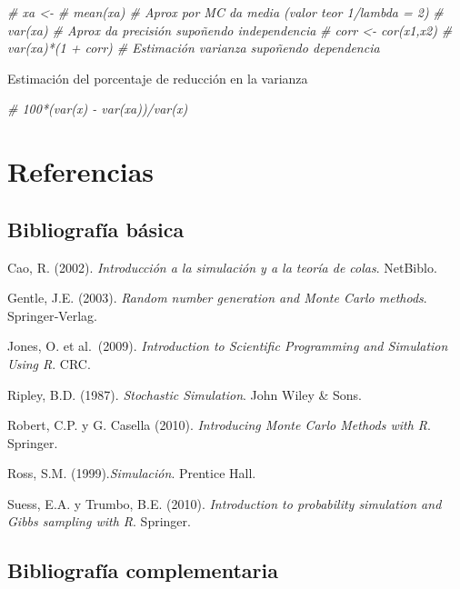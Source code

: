 \documentclass[
]{book}
\newenvironment{Shaded}{\begin{snugshade}}{\end{snugshade}}
\newcommand{\CommentTok}[1]{\textcolor[rgb]{0.56,0.35,0.01}{\textit{#1}}}
\theoremstyle{break}
\theoremstyle{definition}
\theoremstyle{definition}
\theoremstyle{definition}
\theoremstyle{remark}
\begin{document}
\begin{Shaded}
\begin{Highlighting}[]
\CommentTok{# xa <-}
\CommentTok{# mean(xa) # Aprox por MC da media (valor teor 1/lambda = 2)}
\CommentTok{# var(xa)  # Aprox da precisión supoñendo independencia}
\CommentTok{# corr <- cor(x1,x2)}
\CommentTok{# var(xa)*(1 + corr) # Estimación varianza supoñendo dependencia}
\end{Highlighting}
\end{Shaded}

Estimación del porcentaje de reducción en la varianza

\begin{Shaded}
\begin{Highlighting}[]
\CommentTok{# 100*(var(x) - var(xa))/var(x)}
\end{Highlighting}
\end{Shaded}

\hypertarget{referencias}{%
\chapter*{Referencias}\label{referencias}}

\hypertarget{bibliografuxeda-buxe1sica}{%
\section*{Bibliografía básica}\label{bibliografuxeda-buxe1sica}}

Cao, R. (2002). \emph{Introducción a la simulación y a la teoría de colas}. NetBiblo.

Gentle, J.E. (2003). \emph{Random number generation and Monte Carlo methods}. Springer‐Verlag.

Jones, O. et al.~(2009). \emph{Introduction to Scientific Programming and Simulation Using R}. CRC.

Ripley, B.D. (1987). \emph{Stochastic Simulation}. John Wiley \& Sons.

Robert, C.P. y G. Casella (2010). \emph{Introducing Monte Carlo Methods with R}. Springer.

Ross, S.M. (1999).\emph{Simulación}. Prentice Hall.

Suess, E.A. y Trumbo, B.E. (2010). \emph{Introduction to probability simulation and Gibbs sampling with R}. Springer.

\hypertarget{bibliografuxeda-complementaria}{%
\section*{Bibliografía complementaria}\label{bibliografuxeda-complementaria}}
\end{document}
